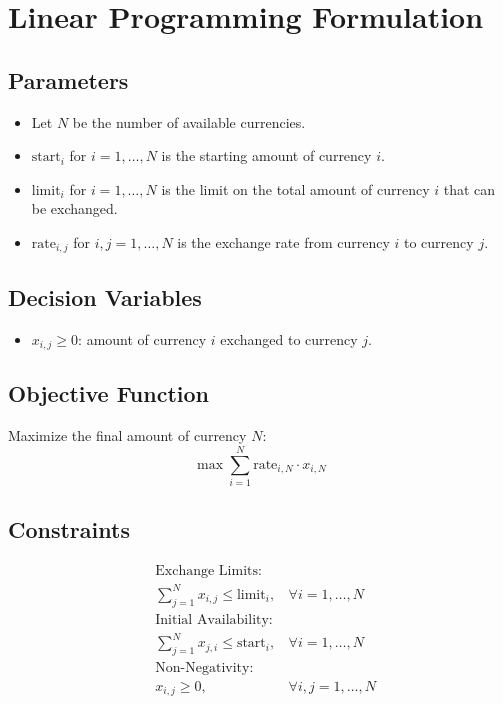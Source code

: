 \documentclass{article}
\begin{document}
\section*{Linear Programming Formulation}

\subsection*{Parameters}
\begin{itemize}
    \item Let \(N\) be the number of available currencies.
    \item \( \text{start}_i \) for \( i = 1, \ldots, N \) is the starting amount of currency \(i\).
    \item \( \text{limit}_i \) for \( i = 1, \ldots, N \) is the limit on the total amount of currency \(i\) that can be exchanged.
    \item \( \text{rate}_{i,j} \) for \( i, j = 1, \ldots, N \) is the exchange rate from currency \(i\) to currency \(j\).
\end{itemize}

\subsection*{Decision Variables}
\begin{itemize}
    \item \( x_{i,j} \geq 0 \): amount of currency \(i\) exchanged to currency \(j\).
\end{itemize}

\subsection*{Objective Function}
Maximize the final amount of currency \(N\):
\[
\max \sum_{i=1}^{N} \text{rate}_{i,N} \cdot x_{i,N}
\]

\subsection*{Constraints}
\begin{align*}
    & \text{Exchange Limits: } \\
    & \sum_{j=1}^{N} x_{i,j} \leq \text{limit}_i, & \forall i = 1, \ldots, N \\
    & \text{Initial Availability: } \\
    & \sum_{j=1}^{N} x_{j,i} \leq \text{start}_i, & \forall i = 1, \ldots, N \\
    & \text{Non-Negativity: } \\
    & x_{i,j} \geq 0, & \forall i, j = 1, \ldots, N
\end{align*}
\end{document}
